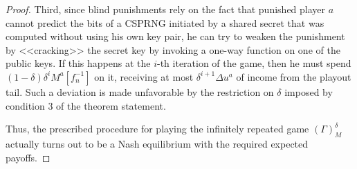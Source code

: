 \begin{proof}[Proof]
	Third, since blind punishments rely on the fact that punished player $a$ cannot predict the bits of a CSPRNG initiated by a shared secret that was computed without using his own key pair, he can try to weaken the punishment by <<cracking>> the secret key by invoking a one-way function on one of the public keys. If this happens at the $i$-th iteration of the game, then he must spend $(1 - \delta) \delta^i M^a[f_n^{-1}]$ on it, receiving at most $\delta^{i+1} \Delta u^a$ of income from the playout tail. Such a deviation is made unfavorable by the restriction on $\delta$ imposed by condition 3 of the theorem statement. %
	
	Thus, the prescribed procedure for playing the infinitely repeated game $(\Gamma)_M^{\delta}$ actually turns out to be a Nash equilibrium with the required expected payoffs. %
\end{proof}

